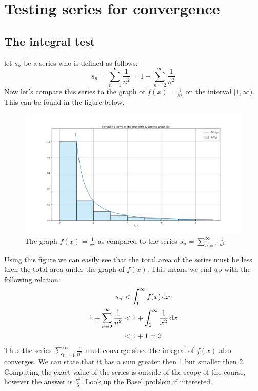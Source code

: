 \documentclass[11pt, a4paper]{article}
\renewcommand*{\d}{\text{d}}
\numberwithin{equation}{section}
\numberwithin{figure}{section}
\begin{document}
\setcounter{section}{2}

\section{Testing series for convergence}

\subsection{The integral test}
let $s_n$ be a series who is defined as follows:
\begin{equation}
  s_n = \sum_{n=1}^\infty \frac{1}{n^2} = 1 + \sum_{n=2}^\infty \frac{1}{n^2}
\end{equation}
Now let's compare this series to the graph of $f(x) = \frac{1}{x^2}$ on the interval $[1, \infty)$. This can be found in the figure below.
\begin{figure}[h]
  \centerline{\includegraphics[width=120mm]{images/graph_1.png}}
  \caption{The graph $f(x)=\frac{1}{x^2}$ as compared to the series $ s_n = \sum_{n=1}^\infty \frac{1}{n^2}$}
\end{figure}
Using this figure we can easily see that the total area of the series must be less then the total area under the graph of $f(x)$. This means we end up with the following relation:
\begin{align}
  s_n &< \int_1^\infty f(x) \,\d x\\
  1 + \sum_{n=2}^\infty \frac{1}{n^2} &< 1 + \int_1^\infty \frac{1}{x^2} \,\d x\\ 
                                      &< 1 + 1 = 2 \notag
\end{align}
Thus the series $\sum_{n=1}^\infty \frac{1}{n^2}$ must converge since the integral of $f(x)$ also converges. We can state that it has a sum greater then 1 but smaller then 2. Computing the exact value of the series is outside of the scope of the course, however the answer is $\frac{\pi^2}{6}$. Look up the Basel problem if interested.\\
\end{document}
